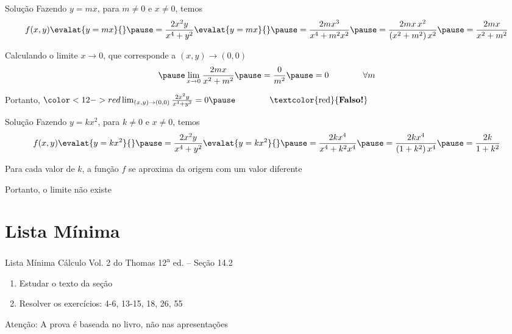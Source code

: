 \documentclass[fleqn,utf8,aspectratio=169,12pt,ignorenonframetext]{beamer}
\begin{document}
\begin{resolution}{Solução}
  Fazendo \(y=mx\), para \(m\neq 0\) e \(x\neq 0\),
  \pause
  temos
  \[
    f(x, y)\evalat{y=mx}{}
    \pause
    = \frac{2x^2y}{x^4+y^2} \evalat{y=mx}{}
    \pause
    = \frac{2mx^3}{x^4+m^2x^2}
    \pause
    = \frac{2mx\,x^2}{\left(x^2+m^2\right)x^2}
    \pause
    = \frac{2mx}{x^2+m^2}
  \]

  \pause
  Calculando o limite \(x\to 0\), que corresponde a \((x, y)\to (0, 0)\)
  \[
    \pause
    \lim_{x\to 0} \frac{2mx}{x^2+m^2}
    \pause
    = \frac{0}{m^2}
    \pause
    = 0
    \qquad\qquad
    \forall m
  \]

  \pause
  Portanto,
  \(
    {
      \color<12->{red}
      \lim_{(x, y)\to(0, 0)} \frac{2x^2y}{x^4+y^2} = 0
    }
    \pause
    \qquad
    \qquad
    \text{\textcolor{red}{\textbf{Falso!}}}
  \)
\end{resolution}

\begin{resolution}{Solução}
  Fazendo \(y=kx^2\), para \(k\neq 0\) e \(x\neq 0\),
  \pause
  temos
  \[
  f(x, y)\evalat{y=kx^2}{}
  \pause
  = \frac{2x^2y}{x^4+y^2} \evalat{y=kx^2}{}
  \pause
  = \frac{2kx^4}{x^4+k^2x^4}
  \pause
  = \frac{2kx^4}{\left(1+k^2\right)x^4}
  \pause
  = \frac{2k}{1+k^2}
  \]

  \pause
  Para cada valor de $k$, a função $f$ se aproxima da origem com um valor diferente

  \pause
  Portanto, o limite não existe
\end{resolution}

\section{Lista Mínima}

\begin{frame}{Lista Mínima}
  Cálculo Vol. 2 do Thomas 12\textsuperscript{a} ed. -- Seção 14.2
  \begin{enumerate}
    \item Estudar o texto da seção
    \item Resolver os exercícios: 4-6, 13-15, 18, 26, 55
  \end{enumerate}

  \vfill
  Atenção: A prova é baseada no livro, não nas apresentações
\end{frame}

\end{document}
